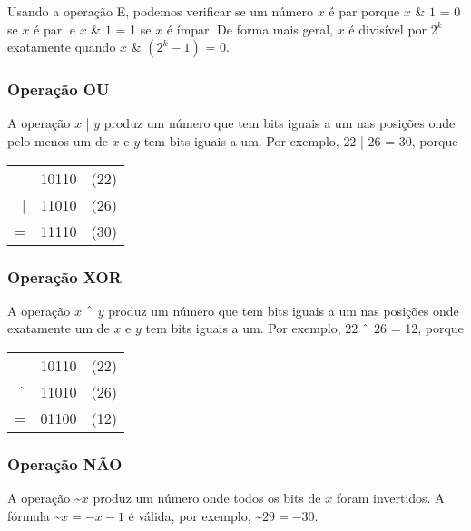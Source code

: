 Usando a operação E, podemos verificar se um número
$x$ é par porque
$x$ \& $1$ = 0 se $x$ é par, e
$x$ \& $1$ = 1 se $x$ é ímpar.
De forma mais geral, $x$ é divisível por $2^k$
exatamente quando $x$ \& $(2^k-1)$ = 0.

\subsubsection{Operação OU}


A operação  $x$ | $y$ produz um número
que tem bits iguais a um nas posições onde pelo menos um
de $x$ e $y$ tem bits iguais a um.
Por exemplo, $22$ | $26$ = 30, porque

\begin{center}
\begin{tabular}{rrr}
& 10110 & (22)\\
| & 11010 & (26) \\
\hline
 = & 11110 & (30) \\
\end{tabular}
\end{center}

\subsubsection{Operação XOR}


A operação  $x$ $\XOR$ $y$ produz um número
que tem bits iguais a um nas posições onde exatamente um
de $x$ e $y$ tem bits iguais a um.
Por exemplo, $22$ $\XOR$ $26$ = 12, porque

\begin{center}
\begin{tabular}{rrr}
& 10110 & (22)\\
$\XOR$ & 11010 & (26) \\
\hline
 = & 01100 & (12) \\
\end{tabular}
\end{center}

\subsubsection{Operação NÃO}


A operação  \textasciitilde$x$
produz um número onde todos os bits de $x$
foram invertidos.
A fórmula \textasciitilde$x = -x-1$ é válida,
por exemplo, \textasciitilde$29 = -30$.

